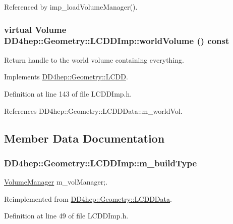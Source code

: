 Referenced by imp\_\-loadVolumeManager().\hypertarget{class_d_d4hep_1_1_geometry_1_1_l_c_d_d_imp_a299a2cba9bd2dcb247df2e254fb07125}{
\subsubsection[{worldVolume}]{\setlength{\rightskip}{0pt plus 5cm}virtual {\bf Volume} DD4hep::Geometry::LCDDImp::worldVolume () const}}
\label{class_d_d4hep_1_1_geometry_1_1_l_c_d_d_imp_a299a2cba9bd2dcb247df2e254fb07125}


Return handle to the world volume containing everything. 

Implements \hyperlink{class_d_d4hep_1_1_geometry_1_1_l_c_d_d_aa7d089039516ff312cf95168288019fe}{DD4hep::Geometry::LCDD}.

Definition at line 143 of file LCDDImp.h.

References DD4hep::Geometry::LCDDData::m\_\-worldVol.

\subsection{Member Data Documentation}
\hypertarget{class_d_d4hep_1_1_geometry_1_1_l_c_d_d_imp_a5cd51ba18f6d2e7723acc93d9b7a90e4}{
\subsubsection[{m\_\-buildType}]{ {\bf DD4hep::Geometry::LCDDImp::m\_\-buildType}}}
\label{class_d_d4hep_1_1_geometry_1_1_l_c_d_d_imp_a5cd51ba18f6d2e7723acc93d9b7a90e4}


\hyperlink{class_d_d4hep_1_1_geometry_1_1_volume_manager}{VolumeManager} m\_\-volManager;. 

Reimplemented from \hyperlink{class_d_d4hep_1_1_geometry_1_1_l_c_d_d_data_aac00f4e1c495c5fb7a80037be3acb19e}{DD4hep::Geometry::LCDDData}.

Definition at line 49 of file LCDDImp.h.

